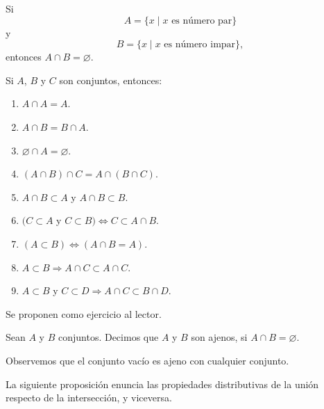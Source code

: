 \begin{examplebox}{}{}
    Si
    $$A = \{x \mid x \text{ es número par}\}$$
    y
    $$B = \{x \mid x \text{ es número impar}\},$$
    entonces $A \cap B = \varnothing$.
\end{examplebox}

\begin{prop}{}{}
    Si $A$, $B$ y $C$ son conjuntos, entonces:
    \begin{enumerate}[label=\roman*., topsep=6pt, itemsep=0pt]
        \item $A \cap A=A$.
        \item $A \cap B=B \cap A$.
        \item $\varnothing \cap A=\varnothing$.
        \item $(A \cap B) \cap C=A \cap(B \cap C)$.
        \item $A \cap B \subset A$ y $A \cap B \subset B$.
        \item $(C \subset A$ y $C \subset B) \Longleftrightarrow C \subset A \cap B$.
        \item $(A \subset B) \Longleftrightarrow(A \cap B=A)$.
        \item $A \subset B \Longrightarrow A \cap C \subset A \cap C$.
        \item $A \subset B$ y $C \subset D \Longrightarrow A \cap C \subset B \cap D$.
    \end{enumerate}
    \tcblower
    \demostracion Se proponen como ejercicio al lector.
\end{prop}

\begin{definicion}{}{}
    Sean $A$ y $B$ conjuntos. Decimos que $A$ y $B$ son ajenos, si $A \cap B = \varnothing$.
\end{definicion}

Observemos que el conjunto vacío es ajeno con cualquier conjunto.

La siguiente proposición enuncia las propiedades distributivas de la unión respecto de la intersección, y viceversa.

